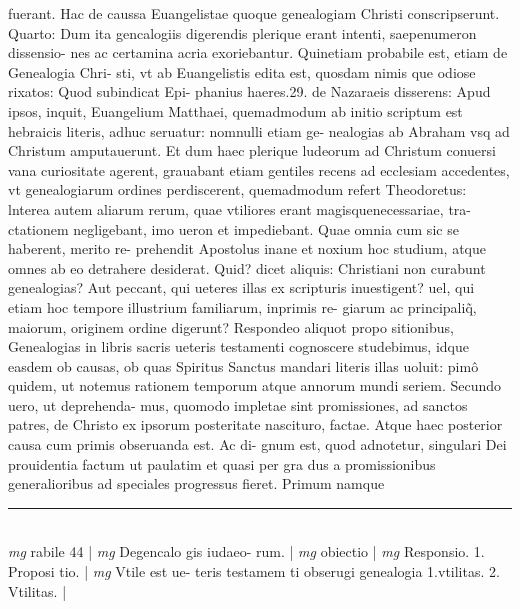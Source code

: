 \documentclass{article}
\begin{document}
\begin{pages}
fuerant. Hac de caussa Euangelistae quoque  genealogiam Christi conscripserunt. Quarto: Dum ita gencalogiis digerendis plerique  erant intenti, saepenumeron dissensio- nes ac certamina acria exoriebantur. Quinetiam probabile est, etiam de Genealogia Chri- sti, vt ab Euangelistis edita est, quosdam nimis que  odiose rixatos: Quod subindicat Epi- phanius haeres.29. de Nazaraeis disserens: Apud ipsos, inquit, Euangelium Matthaei, quemadmodum ab initio scriptum est hebraicis literis, adhuc seruatur: nomnulli etiam ge- nealogias ab Abraham vsq ad Christum amputauerunt.  \pend\pstart Et dum haec plerique  ludeorum ad Christum conuersi vana curiositate agerent, grauabant etiam gentiles recens ad ecclesiam accedentes, vt genealogiarum ordines perdiscerent, quemadmodum refert Theodoretus: lnterea autem aliarum rerum, quae vtiliores erant magisquenecessariae, tra- ctationem negligebant, imo ueron et impediebant. Quae omnia cum sic se haberent, merito re- prehendit Apostolus inane et noxium hoc studium, atque omnes ab eo detrahere desiderat.  \pend\pstart Quid? dicet aliquis: Christiani non curabunt genealogias? Aut peccant, qui ueteres illas ex scripturis inuestigent? uel, qui etiam hoc tempore illustrium familiarum, inprimis re- giarum ac principaliq̃, maiorum, originem ordine digerunt? Respondeo aliquot propo sitionibus, Genealogias in libris sacris ueteris testamenti cognoscere studebimus, idque  easdem ob causas, ob quas Spiritus Sanctus mandari literis illas uoluit: pimô quidem, ut notemus rationem temporum atque  annorum mundi seriem. Secundo uero, ut deprehenda- mus, quomodo impletae sint promissiones, ad sanctos patres, de Christo ex ipsorum posteritate nascituro, factae. Atque  haec posterior causa cum primis obseruanda est. Ac di- gnum est, quod adnotetur, singulari Dei prouidentia factum ut paulatim et quasi per gra dus a promissionibus generalioribus ad speciales progressus fieret. Primum namque   \pend
\vspace{0.5cm}\noindent
\vspace{0.2cm}\rule{1cm}{0.2pt}\\ 
\hspace{0.2cm}\textit{mg}
\footnotesize rabile 44 
\normalsize| 
\hspace{0.2cm}\textit{mg}
\footnotesize Degencalo gis iudaeo- rum. 
\normalsize| 
\hspace{0.2cm}\textit{mg}
\footnotesize obiectio 
\normalsize| 
\hspace{0.2cm}\textit{mg}
\footnotesize Responsio. 1. Proposi tio. 
\normalsize| 
\hspace{0.2cm}\textit{mg}
\footnotesize Vtile est ue- teris testamem ti obserugi genealogia 1.vtilitas. 2. Vtilitas. 
\normalsize| 

\end{pages}
\end{document}
